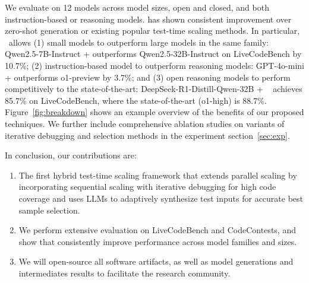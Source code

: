 We evaluate \frameworkname on 12 models across model sizes, open and closed, and both instruction-based or reasoning models. \frameworkname has shown consistent improvement over zero-shot generation or existing popular test-time scaling methods. In particular, \frameworkname~allows (1) small models to outperform large models in the same family: Qwen2.5-7B-Instruct + \frameworkname outperforms Qwen2.5-32B-Instruct on LiveCodeBench by 10.7\%; (2) instruction-based model to outperform reasoning models: GPT-4o-mini + \frameworkname outperforms o1-preview by 3.7\%; 
and (3) open reasoning models to perform competitively to the state-of-the-art: DeepSeek-R1-Distill-Qwen-32B + \frameworkname~ achieves 85.7\% on LiveCodeBench, where the state-of-the-art (o1-high) is 88.7\%.
Figure~\ref{fig:breakdown} shows an example overview of the benefits of our proposed techniques.
We further include comprehensive ablation studies on 
variants of iterative debugging and selection methods in the experiment section~\ref{sec:exp}.

In conclusion, our contributions are:
\begin{enumerate}
\item The first hybrid test-time scaling framework that extends parallel scaling by incorporating sequential scaling with iterative debugging for high code coverage and uses LLMs to adaptively synthesize test inputs for accurate best sample selection. 
\item We perform extensive evaluation on LiveCodeBench and CodeContests, and show that \frameworkname consistently improve performance across model families and sizes.
\item We will open-source all software artifacts, as well as model generations and intermediates results to facilitate the research community.
\end{enumerate}

\iffalse
In conclusion, our contributions are:
\begin{enumerate}
\item A framework that incorporates repeated sampling with revision from test execution result, LLM selection with code execution result to effectively leverage test-time compute to improve code generation.
\item We perform extensive evaluation on LiveCodeBench and CodeContests, and show that \frameworkname consistently improve performance across model sizes.
\item We will open-source all software artifacts, as well as model generations and intermediates results to facilitate the research community.
\end{enumerate}
\fi

